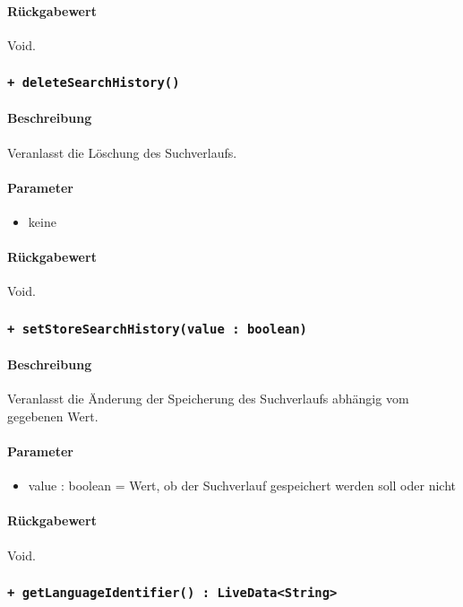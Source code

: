 \paragraph*{Rückgabewert}
Void.

\subsubsection*{\texttt{+ deleteSearchHistory()}}%
\paragraph*{Beschreibung}
Veranlasst die Löschung des Suchverlaufs.
\paragraph*{Parameter}
\begin{itemize}
    \item keine
\end{itemize}
\paragraph*{Rückgabewert}
Void.

\subsubsection*{\texttt{+ setStoreSearchHistory(value : boolean)}}%
\paragraph*{Beschreibung}
Veranlasst die Änderung der Speicherung des Suchverlaufs abhängig vom gegebenen Wert.
\paragraph*{Parameter}
\begin{itemize}
    \item value : boolean = Wert, ob der Suchverlauf gespeichert werden soll oder nicht
\end{itemize}
\paragraph*{Rückgabewert}
Void.

\subsubsection*{\texttt{+ getLanguageIdentifier() : LiveData<String>}}%
